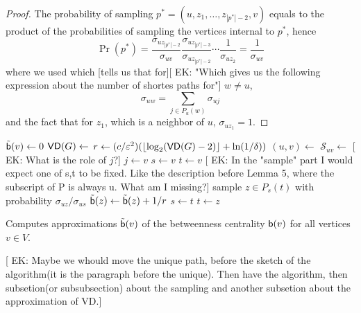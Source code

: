 \begin{proof}
  The probability of sampling $p^*=(u,z_1,\dotsc,z_{|p^*|-2},v)$ equals to the
  product of the probabilities of sampling the vertices internal to $p^*$, hence
  \[
  \Pr(p^*)=\frac{\sigma_{uz_{|p^*|-2}}}{\sigma_{uv}}\frac{\sigma_{uz_{|p^*|-3}}}{\sigma_{uz_{|p^*|-2}}}\dotsb
  \frac{1}{\sigma_{uz_2}}=\frac{1}{\sigma_{uv}}
  \]
  where we used \citep[Lemma3]{Brandes01} which [tells us that for][ EK: "Which gives us the following expression 
  about the number of shortes paths for"] $w\neq u$,
  \[
  \sigma_{uw}=\sum_{j\in P_u(w)}\sigma_{uj}
  \]
  and the fact that for $z_1$, which is a neighbor of $u$, $\sigma_{uz_1}=1$.
\end{proof}

\begin{algorithm}[ht]
   \DontPrintSemicolon
  {
  $\tilde{\mathsf{b}}(v)\leftarrow 0$
  }
  $\mathsf{VD}(G)\leftarrow$\label{alg:diamcomp}\; 
  $r\leftarrow (c/\varepsilon^2)(\lfloor\log_2(\mathsf{VD}(G)-2)\rfloor+\ln(1/\delta))$\;
  {\label{algline:forloop}
  $(u,v)\leftarrow$\label{algline:samplevertices}\;
  $\mathcal{S}_{uv}\leftarrow$\label{algline:shortestpaths}\;
  {
  [ EK: What is the role of $j$?]
  $j\leftarrow v$\;
  $s\leftarrow v$\;
  $t\leftarrow v$\;
   {
  [ EK: In the "sample" part I would expect one of s,t to be fixed. Like the description before Lemma 5, 
  where the subscript of P is always u. What am I missing?]
  sample $z\in P_s(t)$ with probability $\sigma_{uz}/\sigma_{us}$\;
   {
  $\tilde{\mathsf{b}}(z) \leftarrow \tilde{\mathsf{b}}(z)+1/r$\;
  $s\leftarrow t$\;
  $t\leftarrow z$\;
  }
  }
  }
  } %
  \caption{Computes approximations $\tilde{\mathsf{b}}(v)$ of the betweenness
  centrality $\mathsf{b}(v)$ for all vertices $v\in V$.}
  \label{alg:algorithm}
\end{algorithm}
[ EK: Maybe we whould move the unique path, before the sketch of the algorithm(it is the paragraph before the unique).
Then have the algorithm, then subsetion(or subsubsection) about the sampling and another subsetion about the 
approximation of VD.]

